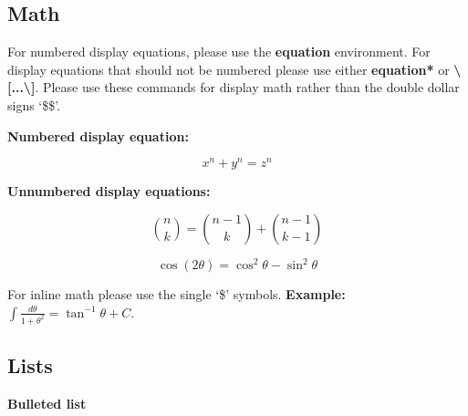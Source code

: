 \documentclass{csmagazine}
\begin{document}



\subsection{Math}

For numbered display equations, please use the \textbf{equation} environment. For display equations that should not be numbered please use either \textbf{equation*}  or \textbf{\textbackslash[...\textbackslash]}. Please use these commands for display math rather than the double dollar signs `\$\$'.

\textbf{Numbered display equation:}

\begin{equation}
x^n + y^n = z^n
\end{equation}

\textbf{Unnumbered display equations:}

\[\binom{n}{k} =\binom{n-1}{k} + \binom{n-1}{k-1}\]


\begin{equation*}
\cos (2\theta) = \cos^2 \theta - \sin^2 \theta
\end{equation*}


For inline math please use the single `\$' symbols. \textbf{Example:} $\int\frac{d\theta} {1+\theta^2}=\tan^{-1} \theta+C$.

\pagebreak

\subsection{Lists}

\textbf{Bulleted list}
\end{document}
